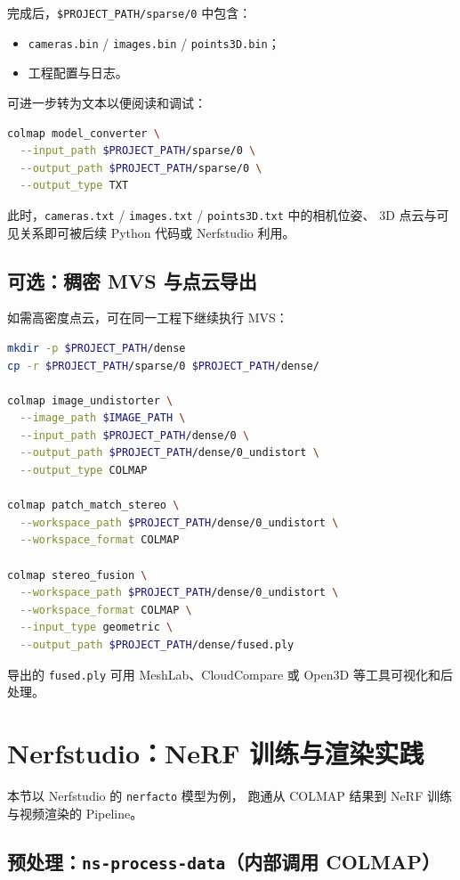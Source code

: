 \documentclass[12pt]{ctexart}
\begin{document}
完成后，\texttt{\$PROJECT\_PATH/sparse/0} 中包含：
\begin{itemize}
  \item \texttt{cameras.bin} / \texttt{images.bin} / \texttt{points3D.bin}；
  \item 工程配置与日志。
\end{itemize}

可进一步转为文本以便阅读和调试：
\begin{lstlisting}[language=bash]
colmap model_converter \
  --input_path $PROJECT_PATH/sparse/0 \
  --output_path $PROJECT_PATH/sparse/0 \
  --output_type TXT
\end{lstlisting}

此时，\texttt{cameras.txt} / \texttt{images.txt} / \texttt{points3D.txt} 中的相机位姿、
3D 点云与可见关系即可被后续 Python 代码或 Nerfstudio 利用。

\subsection{可选：稠密 MVS 与点云导出}

如需高密度点云，可在同一工程下继续执行 MVS：
\begin{lstlisting}[language=bash]
mkdir -p $PROJECT_PATH/dense
cp -r $PROJECT_PATH/sparse/0 $PROJECT_PATH/dense/

colmap image_undistorter \
  --image_path $IMAGE_PATH \
  --input_path $PROJECT_PATH/dense/0 \
  --output_path $PROJECT_PATH/dense/0_undistort \
  --output_type COLMAP

colmap patch_match_stereo \
  --workspace_path $PROJECT_PATH/dense/0_undistort \
  --workspace_format COLMAP

colmap stereo_fusion \
  --workspace_path $PROJECT_PATH/dense/0_undistort \
  --workspace_format COLMAP \
  --input_type geometric \
  --output_path $PROJECT_PATH/dense/fused.ply
\end{lstlisting}

导出的 \texttt{fused.ply} 可用 MeshLab、CloudCompare 或 Open3D 等工具可视化和后处理。

\section{Nerfstudio：NeRF 训练与渲染实践}

本节以 Nerfstudio 的 \texttt{nerfacto} 模型为例，
跑通从 COLMAP 结果到 NeRF 训练与视频渲染的 Pipeline。

\subsection{预处理：\texttt{ns-process-data}（内部调用 COLMAP）}
\end{document}
